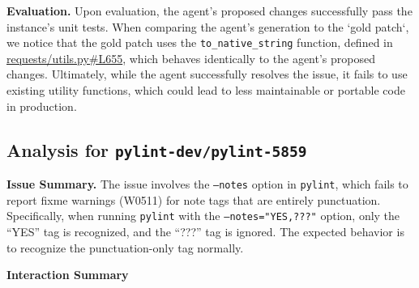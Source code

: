 \textbf{Evaluation.}
Upon evaluation, the agent's proposed changes successfully pass the instance's unit tests.
When comparing the agent's generation to the `gold patch`, we notice that the gold patch uses the \texttt{to\_native\_string} function, defined in \href{https://github.com/psf/requests/blob/091991be0da19de9108dbe5e3752917fea3d7fdc/requests/utils.py#L655}{requests/utils.py\#L655}, which behaves identically to the agent's proposed changes.
Ultimately, while the agent successfully resolves the issue, it fails to use existing utility functions, which could lead to less maintainable or portable code in production.



\subsection*{Analysis for \texttt{pylint-dev/pylint-5859}}
\textbf{Issue Summary.}
The issue involves the \texttt{--notes} option in \texttt{pylint}, which fails to report fixme warnings (W0511) for note tags that are entirely punctuation.
Specifically, when running \texttt{pylint} with the \texttt{--notes="YES,???"} option, only the “YES” tag is recognized, and the “???” tag is ignored.
The expected behavior is to recognize the punctuation-only tag normally.

\textbf{Interaction Summary}

